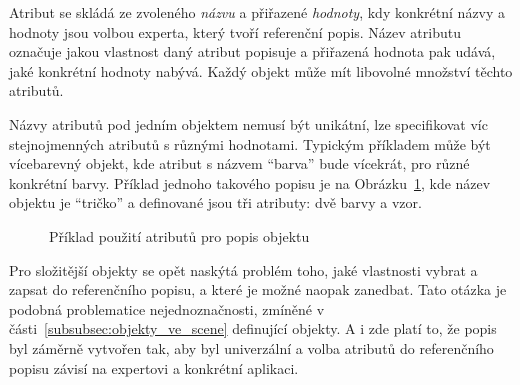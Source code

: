 Atribut se skládá ze zvoleného \emph{názvu} a přiřazené \emph{hodnoty}, kdy konkrétní názvy a hodnoty jsou volbou experta, který tvoří referenční popis.
Název atributu označuje jakou vlastnost daný atribut popisuje a přiřazená hodnota pak udává, jaké konkrétní hodnoty nabývá.
Každý objekt může mít libovolné množství těchto atributů.

Názvy atributů pod jedním objektem nemusí být unikátní, lze specifikovat víc stejnojmenných atributů s různými hodnotami.
Typickým příkladem může být vícebarevný objekt, kde atribut s názvem \enquote{barva} bude vícekrát, pro různé konkrétní barvy.
Příklad jednoho takového popisu je na Obrázku~\ref{fig:example_tshirt}, kde název objektu je \enquote{tričko}
a definované jsou tři atributy: dvě barvy a vzor.

\begin{figure}[H]
	\centering
	\caption{Příklad použití atributů pro popis objektu}\label{fig:example_tshirt}
\end{figure}

Pro složitější objekty se opět naskýtá problém toho, jaké vlastnosti vybrat a zapsat do referenčního popisu, a které je možné naopak zanedbat.
Tato otázka je podobná problematice nejednoznačnosti, zmíněné v části~\ref{subsubsec:objekty_ve_scene} definující objekty.
A i zde platí to, že popis byl záměrně vytvořen tak, aby byl univerzální a volba atributů do referenčního popisu
závisí na expertovi a konkrétní aplikaci.


